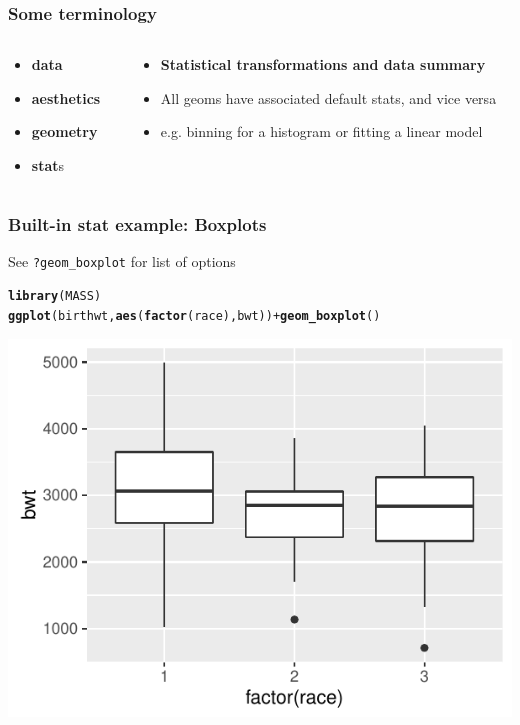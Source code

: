 \documentclass{beamer}\usepackage[]{graphicx}\usepackage[]{color}
\makeatletter
\newcommand{\hlopt}[1]{\textcolor[rgb]{0,0,0}{#1}}%
\newcommand{\hlstd}[1]{\textcolor[rgb]{0.345,0.345,0.345}{#1}}%
\newcommand{\hlkwd}[1]{\textcolor[rgb]{0.737,0.353,0.396}{\textbf{#1}}}%
\newenvironment{kframe}{%
 \def\at@end@of@kframe{}%
 \ifinner\ifhmode%
  \def\at@end@of@kframe{\end{minipage}}%
  \begin{minipage}{\columnwidth}%
 \fi\fi%
 \def\FrameCommand##1{\hskip\@totalleftmargin \hskip-\fboxsep
 \colorbox{shadecolor}{##1}\hskip-\fboxsep
     \hskip-\linewidth \hskip-\@totalleftmargin \hskip\columnwidth}%
 \MakeFramed {\advance\hsize-\width
   \@totalleftmargin\z@ \linewidth\hsize
   \@setminipage}}%
 {\par\unskip\endMakeFramed%
 \at@end@of@kframe}
\newenvironment{knitrout}{}{} %
\makeatother
\begin{document}
\begin{frame}[fragile]
\frametitle{Some terminology}
\begin{columns}[t]

\begin{column}[T]{3cm}
\begin{itemize}
    \item \textbf{\color{gray}data}
    \item \textbf{\color{gray}aesthetics}
    \item \textbf{\color{gray}geometry}
    \item \textbf{stat}s
\end{itemize}
\end{column}

\begin{column}[T]{8cm}
\begin{itemize}
    \item \textbf{Statistical transformations and data summary}
    \item All geoms have associated default stats, and vice versa
    \item e.g. binning for a histogram or fitting a linear model
\end{itemize}
\end{column}

\end{columns}
\end{frame}


\begin{frame}[fragile]
\frametitle{Built-in stat example: Boxplots}
See \texttt{?geom\_boxplot} for list of options
\begin{knitrout}\footnotesize
{}\color{fgcolor}\begin{kframe}
\begin{alltt}
\hlkwd{library}\hlstd{(MASS)}
\hlkwd{ggplot}\hlstd{(birthwt,} \hlkwd{aes}\hlstd{(}\hlkwd{factor}\hlstd{(race), bwt))} \hlopt{+} \hlkwd{geom_boxplot}\hlstd{()}
\end{alltt}
\end{kframe}

{\centering \includegraphics[width=.75\linewidth]{figure/boxplots1-1} 

}



\end{knitrout}
\end{frame}
\end{document}
